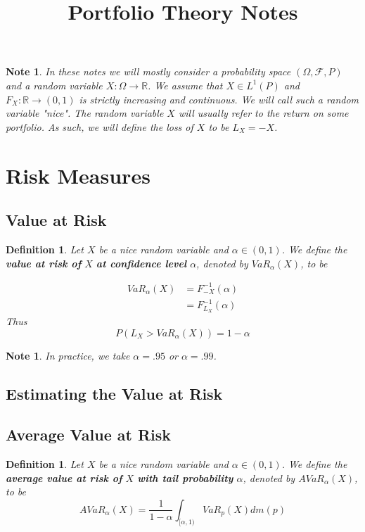 \documentclass[12pt]{amsart}
\newtheorem{defn}[thm]{Definition}
\newtheorem{note}[thm]{Note}
\newcommand{\al}{\alpha}
\newcommand{\Om}{\Omega}
\newcommand{\R}{\mathbb{R}}
\newcommand{\MF}{\mathcal{F}}
\begin{document}
\title{Portfolio Theory Notes}
\maketitle

\tableofcontents

\begin{note}
In these notes we will mostly consider a probability space $(\Om, \MF, P)$ and a random variable $X: \Om \rightarrow \R$. We assume that $X \in L^1(P)$ and $F_X:\R \rightarrow (0,1)$ is strictly increasing and continuous. We will call such a random variable "nice". The random variable $X$ will usually refer to the return on some portfolio. As such, we will define the loss of $X$ to be $L_X = -X$.
\end{note}

\section{Risk Measures}

\subsection{Value at Risk}

\begin{defn}
Let $X$ be a nice random variable and $\al \in (0,1)$. We define the \textbf{value at risk of } $X$ \textbf{at confidence level } $\al$, denoted by $VaR_{\al}(X)$, to be 

\begin{align*}
VaR_{\al}(X) 
&= F^{-1}_{-X}(\al)\\
&= F^{-1}_{L_X}(\al)
\end{align*}
Thus $$P(L_X > VaR_{\al}(X)) = 1- \al$$
\end{defn}

\begin{note}
In practice, we take $\al= .95$ or $\al= .99$. 
\end{note}

\subsection{Estimating the Value at Risk}

\subsection{Average Value at Risk}

 \begin{defn}
Let $X$ be a nice random variable and $\al\in (0,1)$. We define the \textbf{average value at risk of } $X$ \textbf{with tail probability } $\al$, denoted by $AVaR_{\al}(X)$, to be $$AVaR_{\al}(X) = \frac{1}{1-\al}\int_{[\al,1)}VaR_p(X)dm(p)$$
\end{defn}
\end{document}
